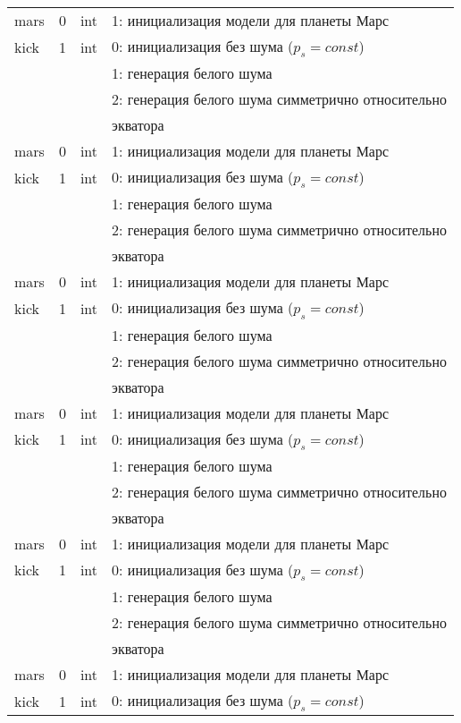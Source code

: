 \begin{longtable*}[c]{|l|c|l|l|}
 mars & 0 & int & 1: инициализация модели для планеты Марс     \\
kick & 1 & int & 0: инициализация без шума (\(p_s = const\)) \\
      &   &     & 1: генерация белого шума                  \\
      &   &     & 2: генерация белого шума симметрично относительно \\
  & & & экватора    \\
 mars & 0 & int & 1: инициализация модели для планеты Марс     \\
kick & 1 & int & 0: инициализация без шума (\(p_s = const\)) \\
      &   &     & 1: генерация белого шума                  \\
      &   &     & 2: генерация белого шума симметрично относительно \\
  & & & экватора    \\
 mars & 0 & int & 1: инициализация модели для планеты Марс     \\
kick & 1 & int & 0: инициализация без шума (\(p_s = const\)) \\
      &   &     & 1: генерация белого шума                  \\
      &   &     & 2: генерация белого шума симметрично относительно \\
  & & & экватора    \\
 mars & 0 & int & 1: инициализация модели для планеты Марс     \\
kick & 1 & int & 0: инициализация без шума (\(p_s = const\)) \\
      &   &     & 1: генерация белого шума                  \\
      &   &     & 2: генерация белого шума симметрично относительно \\
  & & & экватора    \\
 mars & 0 & int & 1: инициализация модели для планеты Марс     \\
kick & 1 & int & 0: инициализация без шума (\(p_s = const\)) \\
      &   &     & 1: генерация белого шума                  \\
      &   &     & 2: генерация белого шума симметрично относительно \\
  & & & экватора    \\
 mars & 0 & int & 1: инициализация модели для планеты Марс     \\
kick & 1 & int & 0: инициализация без шума (\(p_s = const\)) \\

\end{longtable*}
